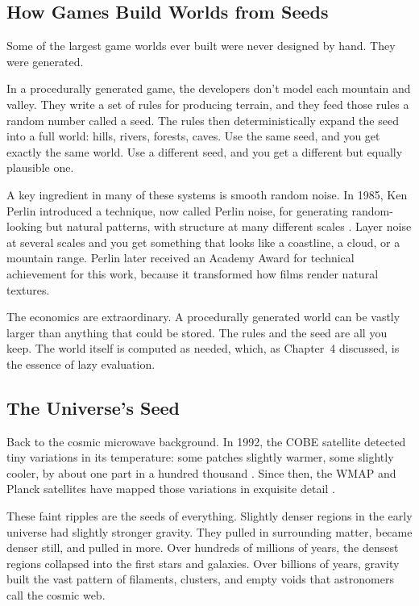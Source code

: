 \subsection{How Games Build Worlds from Seeds}

Some of the largest game worlds ever built were never designed by hand. They were generated.

In a procedurally generated game, the developers don't model each mountain and valley. They write a set of rules for producing terrain, and they feed those rules a random number called a seed. The rules then deterministically expand the seed into a full world: hills, rivers, forests, caves. Use the same seed, and you get exactly the same world. Use a different seed, and you get a different but equally plausible one.

A key ingredient in many of these systems is smooth random noise. In 1985, Ken Perlin introduced a technique, now called Perlin noise, for generating random-looking but natural patterns, with structure at many different scales \cite{perlin1985}. Layer noise at several scales and you get something that looks like a coastline, a cloud, or a mountain range. Perlin later received an Academy Award for technical achievement for this work, because it transformed how films render natural textures.

The economics are extraordinary. A procedurally generated world can be vastly larger than anything that could be stored. The rules and the seed are all you keep. The world itself is computed as needed, which, as Chapter~4 discussed, is the essence of lazy evaluation.

\subsection{The Universe's Seed}

Back to the cosmic microwave background. In 1992, the COBE satellite detected tiny variations in its temperature: some patches slightly warmer, some slightly cooler, by about one part in a hundred thousand \cite{smoot1992}. Since then, the WMAP and Planck satellites have mapped those variations in exquisite detail \cite{planck2018}.

These faint ripples are the seeds of everything. Slightly denser regions in the early universe had slightly stronger gravity. They pulled in surrounding matter, became denser still, and pulled in more. Over hundreds of millions of years, the densest regions collapsed into the first stars and galaxies. Over billions of years, gravity built the vast pattern of filaments, clusters, and empty voids that astronomers call the cosmic web.

